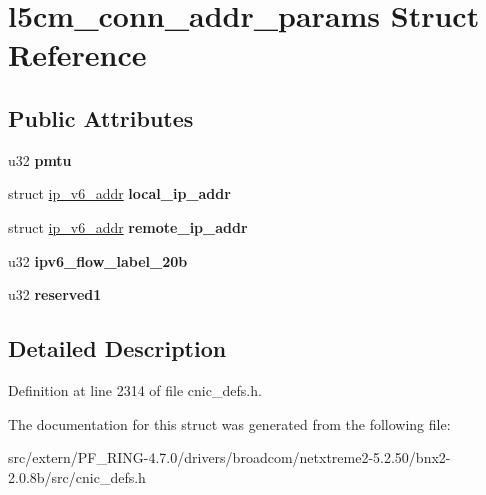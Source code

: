 \hypertarget{structl5cm__conn__addr__params}{
\section{l5cm\_\-conn\_\-addr\_\-params Struct Reference}
\label{structl5cm__conn__addr__params}
}
\subsection*{Public Attributes}
\begin{DoxyCompactItemize}
\item 
\hypertarget{structl5cm__conn__addr__params_a15260fa9c8f3b21ce8ebc42fab70f059}{
u32 {\bfseries pmtu}}
\label{structl5cm__conn__addr__params_a15260fa9c8f3b21ce8ebc42fab70f059}

\item 
\hypertarget{structl5cm__conn__addr__params_ae2214098e930610abd5e503e2b370603}{
struct \hyperlink{structip__v6__addr}{ip\_\-v6\_\-addr} {\bfseries local\_\-ip\_\-addr}}
\label{structl5cm__conn__addr__params_ae2214098e930610abd5e503e2b370603}

\item 
\hypertarget{structl5cm__conn__addr__params_a2a04fdbc6804ef0397663c999617ecfe}{
struct \hyperlink{structip__v6__addr}{ip\_\-v6\_\-addr} {\bfseries remote\_\-ip\_\-addr}}
\label{structl5cm__conn__addr__params_a2a04fdbc6804ef0397663c999617ecfe}

\item 
\hypertarget{structl5cm__conn__addr__params_aad166cfaf89e7fc8a13ed3b0627a821a}{
u32 {\bfseries ipv6\_\-flow\_\-label\_\-20b}}
\label{structl5cm__conn__addr__params_aad166cfaf89e7fc8a13ed3b0627a821a}

\item 
\hypertarget{structl5cm__conn__addr__params_aa0a458d1a2909426e288a9464d4dbf90}{
u32 {\bfseries reserved1}}
\label{structl5cm__conn__addr__params_aa0a458d1a2909426e288a9464d4dbf90}

\end{DoxyCompactItemize}


\subsection{Detailed Description}


Definition at line 2314 of file cnic\_\-defs.h.



The documentation for this struct was generated from the following file:\begin{DoxyCompactItemize}
\item 
src/extern/PF\_\-RING-\/4.7.0/drivers/broadcom/netxtreme2-\/5.2.50/bnx2-\/2.0.8b/src/cnic\_\-defs.h\end{DoxyCompactItemize}
